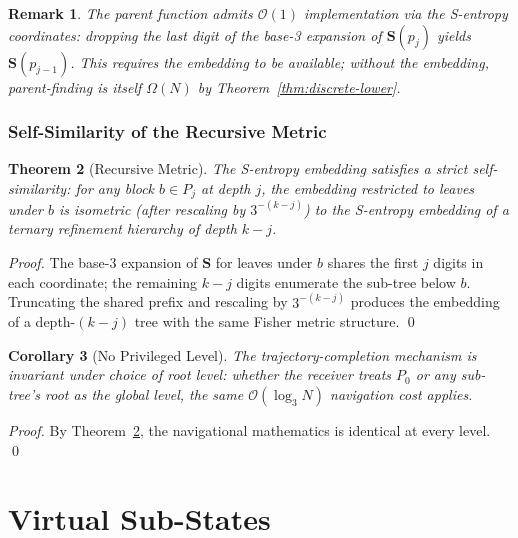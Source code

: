 \documentclass[twocolumn,a4paper]{article}
\newtheorem{theorem}{Theorem}[section]
\newtheorem{corollary}[theorem]{Corollary}
\newtheorem{remark}[theorem]{Remark}
\newcommand{\Stuple}{\mathbf{S}}
\begin{document}
\begin{remark}
The parent function admits $\mathcal{O}(1)$ implementation via the S-entropy coordinates: dropping the last digit of the base-3 expansion of $\Stuple(p_{j})$ yields $\Stuple(p_{j-1})$. This requires the embedding to be available; without the embedding, parent-finding is itself $\Omega(N)$ by Theorem~\ref{thm:discrete-lower}.
\end{remark}

\section{Self-Similarity of the Recursive Metric}
\label{sec:self-similarity}

\begin{theorem}[Recursive Metric]
\label{thm:recursive-metric}
The S-entropy embedding satisfies a strict self-similarity: for any block $b\in P_{j}$ at depth $j$, the embedding restricted to leaves under $b$ is isometric (after rescaling by $3^{-(k-j)}$) to the S-entropy embedding of a ternary refinement hierarchy of depth $k-j$.
\end{theorem}

\begin{proof}
The base-3 expansion of $\Stuple$ for leaves under $b$ shares the first $j$ digits in each coordinate; the remaining $k-j$ digits enumerate the sub-tree below $b$. Truncating the shared prefix and rescaling by $3^{-(k-j)}$ produces the embedding of a depth-$(k-j)$ tree with the same Fisher metric structure. \qed
\end{proof}

\begin{corollary}[No Privileged Level]
\label{cor:no-priv-level}
The trajectory-completion mechanism is invariant under choice of root level: whether the receiver treats $P_{0}$ or any sub-tree's root as the global level, the same $\mathcal{O}(\log_{3}N)$ navigation cost applies.
\end{corollary}

\begin{proof}
By Theorem~\ref{thm:recursive-metric}, the navigational mathematics is identical at every level. \qed
\end{proof}

\part{Virtual Sub-States}
\end{document}
